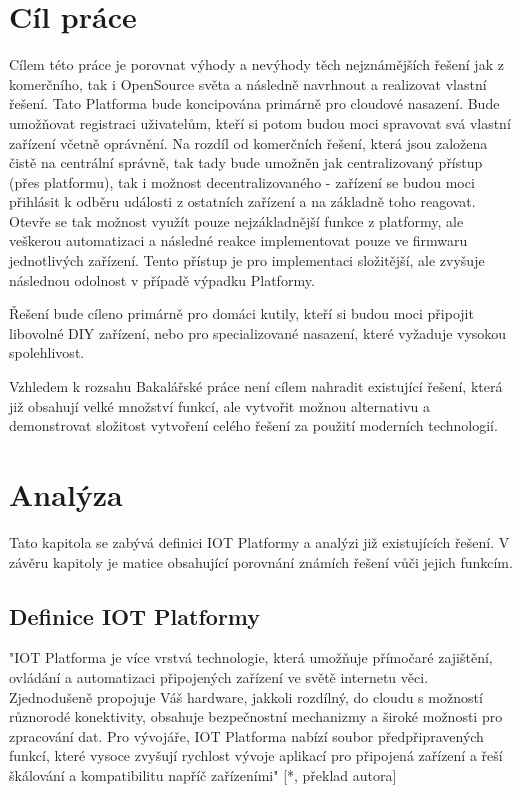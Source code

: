 \documentclass[thesis=B,czech]{FITthesis}[2019/12/23]
\begin{document}
\chapter{Cíl práce}
Cílem této práce je porovnat výhody a nevýhody těch nejznámějších řešení jak z komerčního, tak i OpenSource světa a následně navrhnout a realizovat vlastní řešení. Tato Platforma bude koncipována primárně pro cloudové nasazení. Bude umožňovat registraci uživatelům, kteří si potom budou moci spravovat svá vlastní zařízení včetně oprávnění. Na rozdíl od komerčních řešení, která jsou založena čistě na centrální správně, tak tady bude umožněn jak centralizovaný přístup (přes platformu), tak i možnost decentralizovaného - zařízení se budou moci přihlásit k odběru události z ostatních zařízení a na základně toho reagovat. Otevře se tak možnost využít pouze nejzákladnější funkce z platformy, ale veškerou automatizaci a následné reakce implementovat pouze ve firmwaru jednotlivých zařízení. Tento přístup je pro implementaci složitější, ale zvyšuje následnou odolnost v případě výpadku Platformy.

Řešení bude cíleno primárně pro domáci kutily, kteří si budou moci připojit libovolné DIY zařízení, nebo pro specializované nasazení, které vyžaduje vysokou spolehlivost.

Vzhledem k rozsahu Bakalářské práce není cílem nahradit existující řešení, která již obsahují velké množství funkcí, ale vytvořit možnou alternativu a demonstrovat složitost vytvoření celého řešení za použití moderních technologií.



\chapter{Analýza}
Tato kapitola se zabývá definici IOT Platformy a analýzi již existujících řešení. V závěru kapitoly je matice obsahující porovnání známích řešení vůči jejich funkcím.

\section{Definice IOT Platformy}
"IOT Platforma je více vrstvá technologie, která umožňuje přímočaré zajištění, ovládání a automatizaci připojených zařízení ve světě internetu věci. Zjednodušeně propojuje Váš hardware, jakkoli rozdílný, do cloudu s možností různorodé konektivity, obsahuje bezpečnostní mechanizmy a široké možnosti pro zpracování dat. Pro vývojáře, IOT Platforma nabízí soubor předpřipravených funkcí, které vysoce zvyšují rychlost vývoje aplikací pro připojená zařízení a řeší škálování a kompatibilitu napříč zařízeními" [*, překlad autora] %
\end{document}
